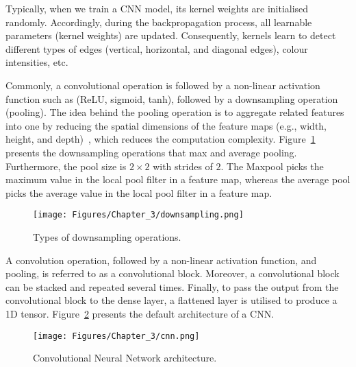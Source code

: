 Typically, when we train a CNN model, its kernel weights are initialised randomly.
Accordingly, during the backpropagation process, all learnable parameters (kernel weights) are updated.
Consequently, kernels learn to detect different types of edges (vertical, horizontal, and diagonal edges), colour intensities, etc.

Commonly, a convolutional operation is followed by a non-linear activation function such as (ReLU, sigmoid, tanh), followed by a downsampling operation (pooling).
The idea behind the pooling operation is to aggregate related features into one by reducing the spatial dimensions of the feature maps (e.g., width, height, and depth)~\cite{Lecun2015}, which reduces the computation complexity.
Figure~\ref{fig:downsampling} presents the downsampling operations that max and average pooling.
Furthermore, the pool size is \(2 \times 2\) with strides of \(2\).
The Maxpool picks the maximum value in the local pool filter in a feature map, whereas the average pool picks the average value in the local pool filter in a feature map.
\begin{figure} [!ht]
	\begin{center}
		\centering
		\texttt{[image: Figures/Chapter\_3/downsampling.png]}
	\end{center}
	\caption{Types of downsampling operations.} 
	\label{fig:downsampling}
\end{figure}
A convolution operation, followed by a non-linear activation function, and pooling, is referred to as a convolutional block.
Moreover, a convolutional block can be stacked and repeated several times. 
Finally, to pass the output from the convolutional block to the dense layer, a flattened layer is utilised to produce a 1D tensor.
Figure~\ref{fig:CNN} presents the default architecture of a CNN.
\begin{figure} [!ht]
	\begin{center}
		\centering
		\texttt{[image: Figures/Chapter\_3/cnn.png]}
	\end{center}
	\caption{Convolutional Neural Network architecture.} 
	\label{fig:CNN}
\end{figure}

